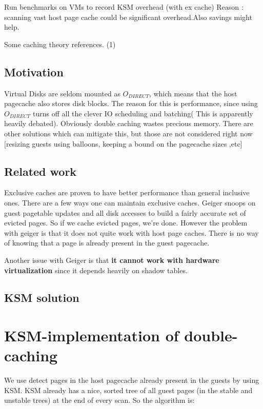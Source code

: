\documentclass[10pt,a4paper]{article}
\begin{document}
Run benchmarks on VMs to record KSM overhead (with ex cache)
Reason : scanning vast host page cache could be significant overhead.Also savings might help.

Some caching theory references.
(1)
\subsection{Motivation}

 Virtual Disks are seldom mounted as $O_{DIRECT}$, which means that the  host pagecache also stores disk blocks. The reason for this is performance,  since using $O_{DIRECT}$ turns off all the clever IO scheduling and batching( This is apparently heavily debated).
Obviously double caching wastes precious memory. There are other solutions which can mitigate this, but those are not considered right now [resizing guests using balloons, keeping a bound on the pagecache sizes ,etc]

\subsection{Related work}

Exclusive caches are proven to have better performance than  general inclusive ones. There are a few ways one can maintain exclusive caches. 
Geiger snoops on guest pagetable updates  and all disk accesses to build a  fairly accurate set of evicted pages. So if we cache evicted pages, we're done. However the problem with geiger is that it does not quite work with host page caches. There is no way of knowing that a page is already present in the guest pagecache. 

Another issue with Geiger is that \textbf{it cannot work with hardware virtualization} since it depends heavily on shadow tables. 

\subsection{KSM solution}

    
\section{KSM-implementation of double-caching}


We use detect pages in the host pagecache already present in the guests by               using KSM. 
KSM already has a nice, sorted tree of all guest pages (in the stable and unstable trees) 
at the end of every scan. So the algorithm is: 
\end{document}

